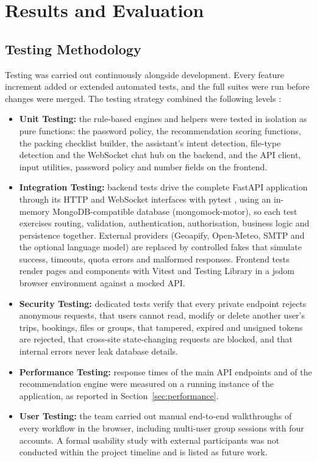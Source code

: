 
\chapter{Results and Evaluation}
\label{chap:results}

\section{Testing Methodology}

Testing was carried out continuously alongside development. Every feature
increment added or extended automated tests, and the full suites were run
before changes were merged. The testing strategy combined the following
levels \cite{pressman2015}:

\begin{itemize}
  \item \textbf{Unit Testing:} the rule-based engines and helpers were
    tested in isolation as pure functions: the password policy, the
    recommendation scoring functions, the packing checklist builder, the
    assistant's intent detection, file-type detection and the WebSocket
    chat hub on the backend, and the API client, input utilities, password
    policy and number fields on the frontend.
  \item \textbf{Integration Testing:} backend tests drive the complete
    FastAPI application through its HTTP and WebSocket interfaces with
    pytest \cite{pytest}, using an in-memory MongoDB-compatible database
    (mongomock-motor), so each test exercises routing, validation,
    authentication, authorisation, business logic and persistence together.
    External providers (Geoapify, Open-Meteo, SMTP and the optional language
    model) are replaced by controlled fakes that simulate success, timeouts,
    quota errors and malformed responses. Frontend tests render pages and
    components with Vitest \cite{vitest} and Testing Library in a jsdom
    browser environment against a mocked API.
  \item \textbf{Security Testing:} dedicated tests verify that every
    private endpoint rejects anonymous requests, that users cannot read,
    modify or delete another user's trips, bookings, files or groups, that
    tampered, expired and unsigned tokens are rejected, that cross-site
    state-changing requests are blocked, and that internal errors never leak
    database details.
  \item \textbf{Performance Testing:} response times of the main API
    endpoints and of the recommendation engine were measured on a running
    instance of the application, as reported in
    Section~\ref{sec:performance}.
  \item \textbf{User Testing:} the team carried out manual end-to-end
    walkthroughs of every workflow in the browser, including multi-user
    group sessions with four accounts. A formal usability study with
    external participants was not conducted within the project timeline and
    is listed as future work.
\end{itemize}

